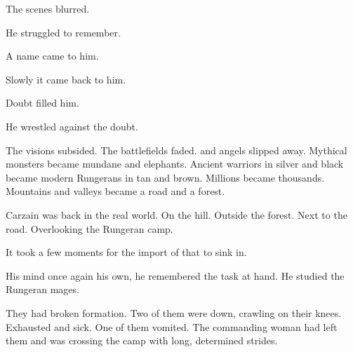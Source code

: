 The scenes blurred. 


He struggled to remember. 


A name came to him. 



Slowly it came back to him. 



Doubt filled him. 


He wrestled against the doubt. 


The visions subsided. 
The battlefields faded. 
\Dragons{} and angels slipped away. 
Mythical monsters became mundane \mulgrons{} and elephants. 
Ancient warriors in silver and black became modern Rungerans in tan and brown. 
Millions became thousands. 
Mountains and valleys became a road and a forest. 

Carzain was back in the real world. 
On the hill. 
Outside the forest. 
Next to the road. 
Overlooking the Rungeran camp. 


It took a few moments for the import of that to sink in. 


His mind once again his own, he remembered the task at hand. 
He studied the Rungeran mages. 

They had broken formation. 
Two of them were down, crawling on their knees. 
Exhausted and sick. 
One of them vomited. 
The commanding woman had left them and was crossing the camp with long, determined strides. 


